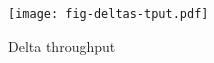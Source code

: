 \begin{figure}[H]
\texttt{[image: fig-deltas-tput.pdf]}
\caption{Delta throughput}
\label{fig:deltas-tput}
\end{figure}
